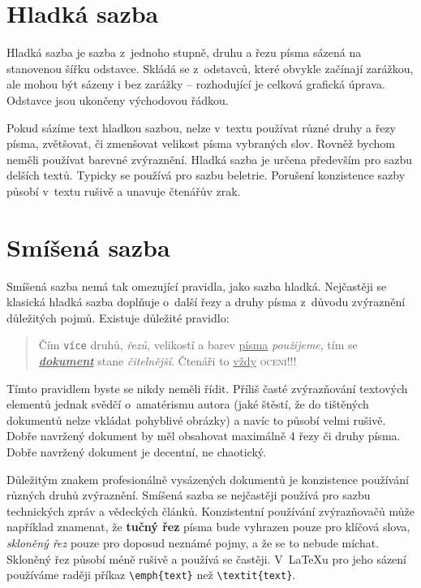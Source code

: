 \documentclass[12pt,a4paper]{article}
\begin{document}


\section{Hladká sazba}

Hladká sazba je sazba z~jednoho stupně, druhu a řezu písma sázená na stanovenou šířku odstavce. Skládá se
z~odstavců, které obvykle začínají zarážkou, ale mohou být sázeny i bez zarážky -- rozhodující je celková
grafická úprava. Odstavce jsou ukončeny východovou řádkou.

Pokud sázíme text hladkou sazbou, nelze v~textu používat různé druhy a řezy písma, zvětšovat, či zmenšovat
velikost písma vybraných slov. Rovněž bychom neměli používat barevné zvýraznění. Hladká sazba je určena
především pro sazbu delších textů. Typicky se používá pro sazbu beletrie. Porušení konzistence sazby působí
v~textu rušivě a unavuje čtenářův zrak.

\section{Smíšená sazba}

Smíšená sazba nemá tak omezující pravidla, jako sazba hladká. Nejčastěji se klasická hladká sazba doplňuje
o~další řezy a druhy písma z~důvodu zvýraznění důležitých pojmů. Existuje důležité pravidlo:

\begin{quotation}
	Čím \texttt{více} {\Large druhů}, \textit{řezů},
	{\Huge v}{\LARGE e}{\Large l}{\large i}{\normalsize k}{\small o}{\footnotesize s}{\scriptsize t}{\tiny í}
	a barev \underline{písma} \textit{použijeme}, tím se \underline{\textbf{\textit{dokument}}} stane
	\textsl{čitelnější}. Čtenáři to \underline{vždy} \textsc{ocení}!!!
\end{quotation}

Tímto pravidlem byste se nikdy neměli řídit. Příliš časté zvýrazňování textových elementů jednak svědčí
o~amatérismu autora (jaké štěstí, že do tištěných dokumentů nelze vkládat pohyblivé obrázky) a navíc to působí
velmi rušivě. Dobře navržený dokument by měl obsahovat maximálně 4 řezy či druhy písma. Dobře navržený
dokument je decentní, ne chaotický.

Důležitým znakem profesionálně vysázených dokumentů je konzistence používání různých druhů zvýraznění.
Smíšená sazba se nejčastěji používá pro sazbu technických zpráv a vědeckých článků. Konzistentní používání
zvýrazňovačů může například znamenat, že \textbf{tučný řez} písma bude vyhrazen pouze pro klíčová slova,
\textit{skloněný řez} pouze pro doposud neznámé pojmy, a že se to nebude míchat. Skloněný řez působí méně
rušivě a používá se častěji. V~\LaTeX{u} pro jeho sázení používáme raději příkaz \verb!\emph{text}! než
\verb!\textit{text}!.
\end{document}
